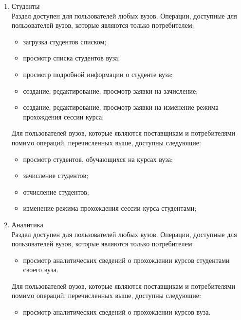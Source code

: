 \begin{enumerate}
	\item Студенты\\
	Раздел доступен для пользователей любых вузов. Операции, доступные для пользователей вузов, которые являются только потребителем:
	\begin{itemize}
		\item загрузка студентов списком;
		\item просмотр списка студентов вуза;
		\item просмотр подробной информации о студенте вуза;
		\item создание, редактирование, просмотр заявки на зачисление;
		\item создание, редактирование, просмотр заявки на изменение режима прохождения сессии курса;
	\end{itemize}
	Для пользователей вузов, которые являются поставщикам и потребителями помимо операций, перечисленных выше, доступны следующие:
	\begin{itemize}
		\item просмотр студентов, обучающихся на курсах вуза;
		\item зачисление студентов;
		\item отчисление студентов;
		\item изменение режима прохождения сессии курса студентами;
	\end{itemize}

	\item Аналитика\\
	Раздел доступен для пользователей любых вузов. Операции, доступные для пользователей вузов, которые являются только потребителем:
	\begin{itemize}
		\item просмотр аналитических сведений о прохождении курсов студентами своего вуза.
	\end{itemize}
	Для пользователей вузов, которые являются поставщикам и потребителями помимо операций, перечисленных выше, доступны следующие:
	\begin{itemize}
		\item просмотр аналитических сведений о прохождении курсов вуза.
	\end{itemize}


\end{enumerate}
